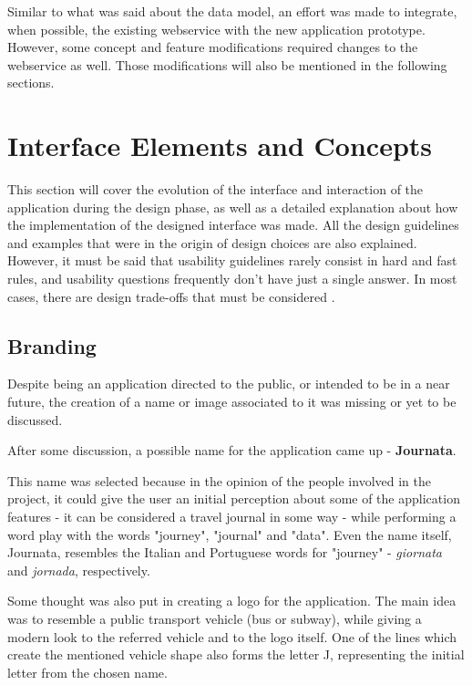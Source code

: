 Similar to what was said about the data model, an effort was made to integrate, when possible, the existing webservice with the new application prototype. However, some concept and feature modifications required changes to the webservice as well. Those modifications will also be mentioned in the following sections.

\clearpage

\section{Interface Elements and Concepts}\label{interfacecon}

This section will cover the evolution of the interface and interaction of the application during the design phase, as well as a detailed explanation about how the implementation of the designed interface was made.
All the design guidelines and examples that were in the origin of design choices are also explained. However, it must be said that usability guidelines rarely consist in hard and fast rules, and usability questions frequently don't have just a single answer. In most cases, there are design trade-offs that must be considered \cite{kn:NB13}.

\subsection{Branding}

Despite being an application directed to the public, or intended to be in a near future, the creation of a name or image associated to it was missing or yet to be discussed.


After some discussion, a possible name for the application came up - \textbf{Journata}.

This name was selected because in the opinion of the people involved in the project, it could give the user an initial perception about some of the application features - it can be considered a travel journal in some way - while performing a word play with the words "journey", "journal" and "data". Even the name itself, Journata, resembles the Italian and Portuguese words for "journey" - \emph{giornata} and \emph{jornada}, respectively.

Some thought was also put in creating a logo for the application. The main idea was to resemble a public transport vehicle (bus or subway), while giving a modern look to the referred vehicle and to the logo itself. One of the lines which create the mentioned vehicle shape also forms the letter J, representing the initial letter from the chosen name.

